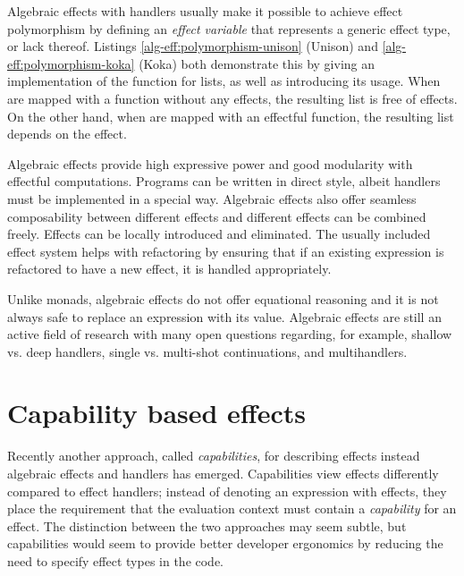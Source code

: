 

Algebraic effects with handlers usually make it possible to achieve effect polymorphism by defining an \emph{effect variable} that represents a generic effect type, or lack thereof. Listings \ref{alg-eff:polymorphism-unison} (Unison) and \ref{alg-eff:polymorphism-koka} (Koka) both demonstrate this by giving an implementation of the  function for lists, as well as introducing its usage. When  are mapped with a function without any effects, the resulting list  is free of effects. On the other hand, when  are mapped with an effectful function, the resulting list  depends on the  effect. 





Algebraic effects provide high expressive power and good modularity with effectful computations. Programs can be written in direct style, albeit handlers must be implemented in a special way. Algebraic effects also offer seamless composability between different effects and different effects can be combined freely. Effects can be locally introduced and eliminated. The usually included effect system helps with refactoring by ensuring that if an existing expression is refactored to have a new effect, it is handled appropriately.

Unlike monads, algebraic effects do not offer equational reasoning and it is not always safe to replace an expression with its value. Algebraic effects are still an active field of research with many open questions regarding, for example, shallow vs. deep handlers, single vs. multi-shot continuations, and multihandlers.



\section{Capability based effects}\label{capability-effs}
Recently another approach, called \emph{capabilities}, for describing effects instead algebraic effects and handlers has emerged. Capabilities view effects differently compared to effect handlers; instead of denoting an expression with effects, they place the requirement that the evaluation context must contain a \emph{capability} for an effect. The distinction between the two approaches may seem subtle, but capabilities would seem to provide better developer ergonomics by reducing the need to specify effect types in the code.~\cite{effects-as-capabilities}

